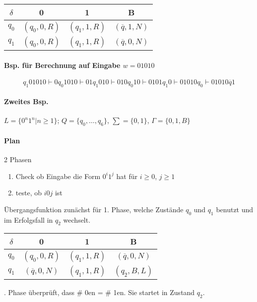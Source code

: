 \begin{table}[htb!]
\centering
\begin{tabular}{c|c c c}
$\delta$ & 0 & 1 & B \\
\hline 
$q_0$ & $(q_0,0,R)$ & $(q_1,1,R)$ & $(\overline{q},1,N)$ \\
$q_1$ & $(q_0,0,R)$ & $(q_1,1,R)$ & $(\overline{q},0,N)$ \\
\end{tabular}
\end{table}

\paragraph*{Bsp. für Berechnung auf Eingabe $w=01010$} $$q_1 01010 \vdash 0q_0 1010 \vdash 01q_1 010 \vdash 010q_0 10 \vdash 0101q_1 0 \vdash 01010q_0 \vdash 01010\overline{q}1$$

\paragraph*{Zweites Bsp.} $L=\{ 0^n1^n | n \geq 1 \}$; $Q=\{ q_0,\dots,q_6 \}$, $\sum=\{0,1\}$, $\Gamma=\{0,1,B\}$

\paragraph*{Plan} 2 Phasen
\begin{enumerate}
	\item Check ob Eingabe die Form $0^i1^j$ hat für $i \geq 0$, $j \geq 1$
	\item teste, ob $i0j$ ist
\end{enumerate}
Übergangsfunktion zunächst für 1. Phase, welche Zustände $q_0$ und $q_1$ benutzt und im Erfolgsfall in $q_2$ wechselt.

\begin{table}[htb!]
\centering
\begin{tabular}{c|c c c}
$\delta$ & 0 & 1 & B \\
\hline 
$q_0$ & $(q_0,0,R)$ & $(q_1,1,R)$ & $(\overline{q},0,N)$ \\
$q_1$ & $(\overline{q},0,N)$ & $(q_1,1,R)$ & $(q_2,B,L)$ \\
\end{tabular}
\end{table}

\par{}. Phase überprüft, dass \# 0en = \# 1en. Sie startet in Zustand $q_2$.\par\medskip

